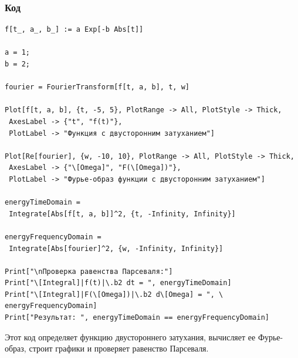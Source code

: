 \documentclass[a4paper,12pt]{article}
\begin{document}
\subsubsection{Код}
\begin{lstlisting}[caption=Фурье-образ двустороннего затухания и проверка равенства Парсеваля]
f[t_, a_, b_] := a Exp[-b Abs[t]]

a = 1;
b = 2;

fourier = FourierTransform[f[t, a, b], t, w]

Plot[f[t, a, b], {t, -5, 5}, PlotRange -> All, PlotStyle -> Thick, 
 AxesLabel -> {"t", "f(t)"}, 
 PlotLabel -> "Функция с двусторонним затуханием"]

Plot[Re[fourier], {w, -10, 10}, PlotRange -> All, PlotStyle -> Thick, 
 AxesLabel -> {"\[Omega]", "F(\[Omega])"}, 
 PlotLabel -> "Фурье-образ функции с двусторонним затуханием"]

energyTimeDomain = 
 Integrate[Abs[f[t, a, b]]^2, {t, -Infinity, Infinity}]

energyFrequencyDomain = 
 Integrate[Abs[fourier]^2, {w, -Infinity, Infinity}]

Print["\nПроверка равенства Парсеваля:"]
Print["\[Integral]|f(t)|\.b2 dt = ", energyTimeDomain]
Print["\[Integral]|F(\[Omega])|\.b2 d\[Omega] = ", \
energyFrequencyDomain]
Print["Результат: ", energyTimeDomain == energyFrequencyDomain]
\end{lstlisting}
Этот код определяет функцию двустороннего затухания, вычисляет ее Фурье-образ, строит графики и проверяет равенство Парсеваля.
\end{document}
